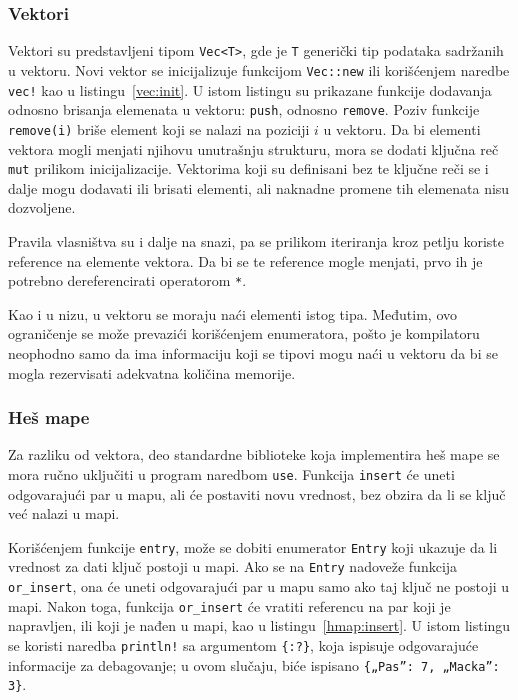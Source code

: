 \documentclass[12pt,oneside]{memoir}
\begin{document}
\subsubsection{Vektori}
Vektori su predstavljeni tipom \texttt{Vec<T>}, gde je \texttt{T} generički tip
podataka sadržanih
u vektoru. Novi vektor se inicijalizuje funkcijom \texttt{Vec::new} ili korišćenjem
naredbe \texttt{vec!} kao u listingu~\ref{vec:init}. U istom listingu su prikazane funkcije
dodavanja odnosno brisanja elemenata u vektoru: \texttt{push}, odnosno \texttt{remove}.
Poziv funkcije \texttt{remove(i)} briše element koji se nalazi na poziciji $i$ u vektoru.
Da bi elementi vektora mogli menjati njihovu unutrašnju strukturu, mora se
dodati ključna reč \texttt{mut} prilikom inicijalizacije. Vektorima koji su definisani bez te
ključne reči se i dalje mogu dodavati ili brisati elementi, ali naknadne promene tih
elemenata nisu dozvoljene.

Pravila vlasništva su i dalje na snazi, pa se prilikom iteriranja kroz petlju
koriste reference na elemente vektora. Da bi se te reference mogle menjati, prvo
ih je potrebno dereferencirati operatorom \texttt{*}.



Kao i u nizu, u vektoru se moraju naći elementi istog tipa. Međutim, ovo
ograničenje se može prevazići korišćenjem enumeratora, pošto je kompilatoru
neophodno samo da ima informaciju koji se tipovi mogu naći u vektoru da bi se
mogla rezervisati adekvatna količina memorije.

\subsubsection{Heš mape}
Za razliku od vektora, deo standardne biblioteke koja implementira heš mape
se mora ručno uključiti u program naredbom \texttt{use}. Funkcija \texttt{insert} će uneti
odgovarajući par u mapu, ali će postaviti novu vrednost, bez obzira da li se ključ već
nalazi u mapi.

Korišćenjem funkcije \texttt{entry}, može se dobiti enumerator \texttt{Entry} koji ukazuje
da li vrednost za dati ključ postoji u mapi. Ako se na \texttt{Entry} nadoveže funkcija
\texttt{or\_insert}, ona će uneti odgovarajući par u mapu samo ako taj ključ ne postoji u
mapi. Nakon toga, funkcija \texttt{or\_insert}
će vratiti referencu na par koji je napravljen, ili koji
je nađen u mapi, kao u listingu~\ref{hmap:insert}. U istom listingu se koristi naredba
\texttt{println!} sa argumentom \texttt{\{:?\}}, koja ispisuje odgovarajuće informacije
za debagovanje; u ovom slučaju, biće ispisano \texttt{\{„Pas”: 7, „Macka”: 3\}}.
\end{document}
